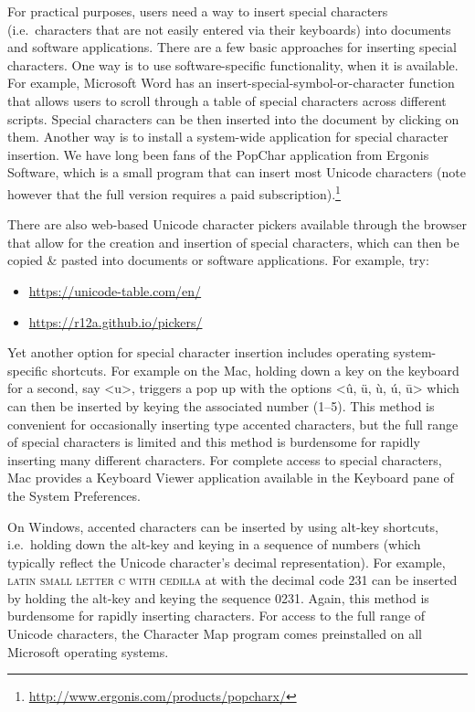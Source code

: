 For practical purposes, users need a way to insert special characters (i.e.\ characters that are not easily entered via their keyboards) into documents and software applications. There are a few basic approaches for inserting special characters. One way is to use software-specific functionality, when it is available. For example, Microsoft Word has an insert-special-symbol-or-character function that allows users to scroll through a table of special characters across different scripts. Special characters can be then inserted into the document by clicking on them. Another way is to install a system-wide application for special character insertion. We have long been fans of the PopChar application from Ergonis Software, which is a small program that can insert most Unicode characters (note however that the full version requires a paid subscription).\footnote{\url{http://www.ergonis.com/products/popcharx/}}

There are also web-based Unicode character pickers available through the browser that allow for the creation and insertion of special characters, which can then be copied \& pasted into documents or software applications. For example, try:

\begin{itemize}
	\item \url{https://unicode-table.com/en/}
	\item \url{https://r12a.github.io/pickers/}
\end{itemize}

Yet another option for special character insertion includes operating system-specific shortcuts. For example on the Mac, holding down a key on the keyboard for a second, say <u>, triggers a pop up with the options <û, ü, ù, ú, ū> which can then be inserted by keying the associated number (1--5). This method is convenient for occasionally inserting type accented characters, but the full range of special characters is limited and this method is burdensome for rapidly inserting many different characters. For complete access to special characters, Mac provides a Keyboard Viewer application available in the Keyboard pane of the System Preferences.

On Windows, accented characters can be inserted by using alt-key shortcuts, i.e.\ holding down the alt-key and keying in a sequence of numbers (which typically reflect the Unicode character's decimal representation). For example, \textsc{latin small letter c with cedilla} at  with the decimal code 231 can be inserted by holding the alt-key and keying the sequence 0231. Again, this method is burdensome for rapidly inserting characters. For access to the full range of Unicode characters, the Character Map program comes preinstalled on all Microsoft operating systems.

